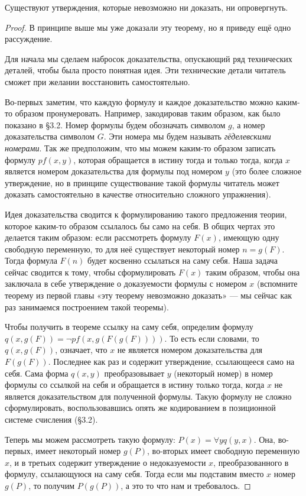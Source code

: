 \begin{thm}
Существуют утверждения, которые невозможно ни доказать, ни опровергнуть.
\end{thm}
\begin{proof}
В принципе выше мы уже доказали эту теорему, но я приведу ещё одно рассуждение.

Для начала мы сделаем набросок доказательства, опускающий ряд технических деталей, чтобы была просто понятная идея. Эти технические детали читатель сможет при желании восстановить самостоятельно.

Во-первых заметим, что каждую формулу и каждое доказательство можно каким-то образом пронумеровать. Например, закодировав таким образом, как было показано в \S3.2. Номер формулы  будем обозначать символом $g$, а номер доказательства символом $G$. Эти номера мы будем называть {\slshape гёделевскими номерами}. Так же предположим, что мы можем каким-то образом записать формулу $pf(x, y)$, которая обращается в истину тогда и только тогда, когда $x$ является номером доказательства для формулы под номером $y$ (это более сложное утверждение, но в принципе существование такой формулы читатель может доказать самостоятельно в качестве относительно сложного упражнения).

Идея доказательства  сводится к формулированию такого предложения теории, которое каким-то образом ссылалось бы само на себя. В общих чертах это делается таким образом: если рассмотреть формулу $F(x)$, имеющую одну свободную переменную, то для неё существует некоторый номер $n=g(F)$. Тогда формула $F(n)$ будет косвенно ссылаться на саму себя. Наша задача сейчас сводится к тому, чтобы сформулировать $F(x)$ таким образом, чтобы она заключала в себе утверждение о доказуемости формулы с номером $x$ (вспомните теорему из первой главы «эту теорему невозможно доказать» — мы сейчас как раз занимаемся построением такой теоремы).

Чтобы получить в теореме ссылку на саму себя, определим формулу $q(x, g(F)) = \neg pf(x, g(F(g(F))))$. То есть если словами, то $q(x, g(F))$, означает, что $x$ не является номером доказательства для $F(g(F))$. Последнее как раз и содержит утверждение, ссылающееся само на себя. Сама форма $q(x, y)$ преобразовывает $y$ (некоторый номер) в номер формулы со ссылкой на себя и обращается в истину только тогда, когда $x$ не является доказательством для полученной формулы. Такую формулу не сложно сформулировать, воспользовавшись опять же кодированием в позиционной системе счисления (\S3.2).

Теперь мы можем рассмотреть такую формулу: $P(x) = \forall y q(y, x)$. Она, во-первых, имеет некоторый номер $g(P)$, во-вторых имеет свободную переменную $x$, и в третьих содержит утверждение о недоказуемости $x$, преобразованного в формулу, ссылающуюся на саму себя. Тогда если мы подставим вместо $x$ номер $g(P)$, то получим $P(g(P))$, а это то что нам и требовалось.


\end{proof}
